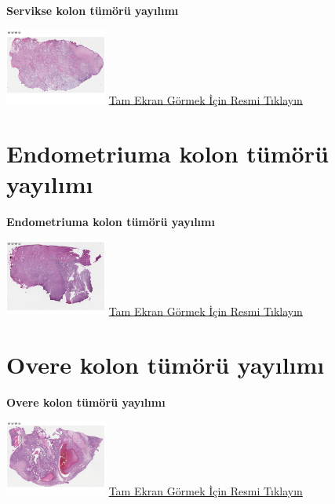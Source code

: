 \documentclass[
  letterpaper,
  DIV=11,
  numbers=noendperiod]{scrreprt}
\begin{document}
\textbf{Servikse kolon tümörü yayılımı}

\href{https://images.patolojiatlasi.com/tumor-spread/HE-cervix.html}{\includegraphics[width=0.25\textwidth,height=\textheight]{./screenshots/thumbnail_tumor-spread-cervix.png}}
\href{https://images.patolojiatlasi.com/tumor-spread/HE-cervix.html}{Tam
Ekran Görmek İçin Resmi Tıklayın}

\hypertarget{sec-endometriuma-kolon-tumor-yayilimi}{%
\section{Endometriuma kolon tümörü
yayılımı}\label{sec-endometriuma-kolon-tumor-yayilimi}}

\textbf{Endometriuma kolon tümörü yayılımı}

\href{https://images.patolojiatlasi.com/tumor-spread/HE-endometrium.html}{\includegraphics[width=0.25\textwidth,height=\textheight]{./screenshots/thumbnail_tumor-spread-endometrium.png}}
\href{https://images.patolojiatlasi.com/tumor-spread/HE-endometrium.html}{Tam
Ekran Görmek İçin Resmi Tıklayın}

\hypertarget{sec-overe-kolon-tumor-yayilimi}{%
\section{Overe kolon tümörü
yayılımı}\label{sec-overe-kolon-tumor-yayilimi}}

\textbf{Overe kolon tümörü yayılımı}

\href{https://images.patolojiatlasi.com/tumor-spread/HE-over.html}{\includegraphics[width=0.25\textwidth,height=\textheight]{./screenshots/thumbnail_tumor-spread-over.png}}
\href{https://images.patolojiatlasi.com/tumor-spread/HE-over.html}{Tam
Ekran Görmek İçin Resmi Tıklayın}
\end{document}

